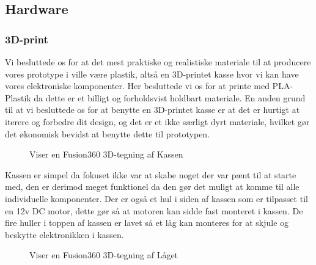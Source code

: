 \documentclass[11pt]{article}
\begin{document}
\subsection{Hardware}
\label{sec:orgdbd4fd8}
\subsubsection{3D-print}
Vi besluttede os for at det mest praktiske og realistiske materiale til at producere vores prototype i ville være plastik, altså en 3D-printet kasse hvor vi kan have vores elektroniske komponenter. Her besluttede vi os for at printe med PLA-Plastik da dette er et billigt og forholdsvist holdbart materiale. En anden grund til at vi besluttede os for at benytte en 3D-printet kasse er at det er hurtigt at iterere og forbedre dit design, og det er et ikke særligt dyrt materiale, hvilket gør det økonomisk bevidst at benytte dette til prototypen.
\begin{figure}[htbp]
    \centering
    \caption{Viser en Fusion360 3D-tegning af Kassen}
    \end{figure}
Kassen er simpel da fokuset ikke var at skabe noget der var pænt til at starte med, den er derimod meget funktionel da den gør det muligt at komme til alle individuelle komponenter. Der er også et hul i siden af kassen som er tilpasset til en 12v DC motor, dette gør så at motoren kan sidde fast monteret i kassen. De fire huller i toppen af kassen er lavet så et låg kan monteres for at skjule og beskytte elektronikken i kassen.

\begin{figure}[htbp]
    \centering
    \caption{Viser en Fusion360 3D-tegning af Låget}
    \end{figure}
\end{document}
